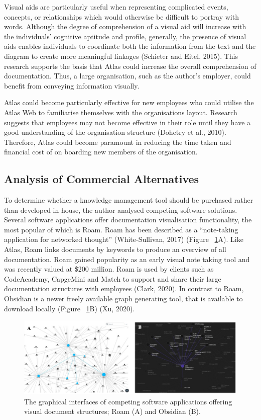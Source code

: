 \documentclass{article}
\begin{document}
Visual aids are particularly useful when representing complicated events, concepts, or relationships which would otherwise be difficult to portray with words. Although the degree of comprehension of a visual aid will increase with the individuals' cognitive aptitude and profile, generally, the presence of visual aids enables individuals to coordinate both the information from the text and the diagram to create more meaningful linkages (Schieter and Eitel, 2015). This research supports the basis that Atlas could increase the overall comprehension of documentation. Thus, a large organisation, such as the author's employer, could benefit from conveying information visually.

Atlas could become particularly effective for new employees who could utilise the Atlas Web to familiarise themselves with the organisations layout. Research suggests that employees may not become effective in their role until they have a good understanding of the organisation structure (Dohetry et al., 2010). Therefore, Atlas could become paramount in reducing the time taken and financial cost of on boarding new members of the organisation. 

\subsection{Analysis of Commercial Alternatives}

To determine whether a knowledge management tool should be purchased rather than developed in house, the author analysed competing software solutions. Several software applications offer documentation visualisation functionality, the most popular of which is Roam. Roam has been described as a “note-taking application for networked thought” (White-Sullivan, 2017) (Figure ~\ref{fig:competitors}A). Like Atlas, Roam links documents by keywords to produce an overview of all documentation. Roam gained popularity as an early visual note taking tool and was recently valued at \$200 million. Roam is used by clients such as CodeAcademy, CapgeMini and Match to support and share their large documentation structures with employees (Clark, 2020). In contrast to Roam, Obsidian is a newer freely available graph generating tool, that is available to download locally (Figure ~\ref{fig:competitors}B) (Xu, 2020).

\begin{figure}[!htb]
  \centering
      \includegraphics[width=1\textwidth]{images/roam-and-obsidian.png}
  \caption{The graphical interfaces of competing software applications offering visual document structures; Roam (A) and Obsidian (B).}
  \label{fig:competitors}
\end{figure}
\end{document}
